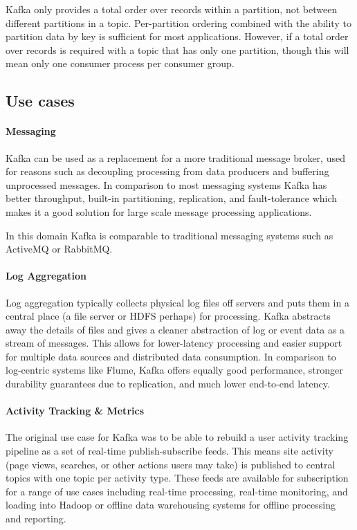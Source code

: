 Kafka only provides a total order over records within a partition, not between different partitions in a topic. Per-partition ordering combined with the ability to partition data by key is sufficient for most applications. However, if a total order over records is required with a topic that has only one partition, though this will mean only one consumer process per consumer group. 

\subsection{Use cases}

\paragraph{Messaging}

Kafka can be used as a replacement for a more traditional message broker, used for reasons such as decoupling processing from data producers and buffering unprocessed messages. In comparison to most messaging systems Kafka has better throughput, built-in partitioning, replication, and fault-tolerance which makes it a good solution for large scale message processing applications.

In this domain Kafka is comparable to traditional messaging systems such as ActiveMQ or RabbitMQ. 

\paragraph{Log Aggregation}

Log aggregation typically collects physical log files off servers and puts them in a central place (a file server or HDFS perhaps) for processing. Kafka abstracts away the details of files and gives a cleaner abstraction of log or event data as a stream of messages. This allows for lower-latency processing and easier support for multiple data sources and distributed data consumption. In comparison to log-centric systems like Flume, Kafka offers equally good performance, stronger durability guarantees due to replication, and much lower end-to-end latency. 
 
\paragraph{Activity Tracking \& Metrics}

The original use case for Kafka was to be able to rebuild a user activity tracking pipeline as a set of real-time publish-subscribe feeds. This means site activity (page views, searches, or other actions users may take) is published to central topics with one topic per activity type. These feeds are available for subscription for a range of use cases including real-time processing, real-time monitoring, and loading into Hadoop or offline data warehousing systems for offline processing and reporting.

